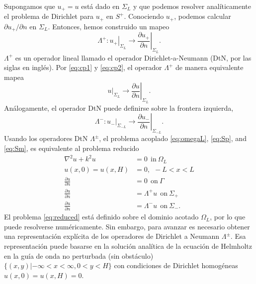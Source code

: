 \documentclass[11pt]{article}
\begin{document}
Supongamos que $u_+ = u$ está dado en $\Sigma_L$ y que podemos resolver analíticamente el problema de Dirichlet para $u_+$ en $S^+$. Conociendo $u_+$, podemos calcular $\partial u_+/\partial n$ en $\Sigma_L$. Entonces, hemos construido un mapeo
\begin{equation}
  \label{eq:12}
  \Lambda^+: \left.u_+\right|_{\Sigma_L} \rightarrow \left.\frac{\partial u_+}{\partial n}\right|_{\Sigma_L}.
\end{equation}
$\Lambda^+$ es un operador lineal llamado el operador Dirichlet-a-Neumann (DtN, por las siglas en inglés). Por \eqref{eq:cp1} y \eqref{eq:cp2}, el operador $\Lambda^+$ de manera equivalente mapea
\begin{equation}
  \label{eq:13}
  \left.u\right|_{\Sigma_L} \rightarrow \left.\frac{\partial u}{\partial n}\right|_{\Sigma_L}.
\end{equation}
Análogamente, el operador DtN puede definirse sobre la frontera izquierda,
\begin{equation}
  \label{eq:14}
  \Lambda^-: \left.u_-\right|_{\Sigma_{-L}} \rightarrow \left.\frac{\partial u_-}{\partial n}\right|_{\Sigma_{-L}}.  
\end{equation}
Usando los operadores DtN $\Lambda^{\pm}$, el problema acoplado \eqref{eq:omegaL}, \eqref{eq:Sp}, and \eqref{eq:Sm}, es equivalente al problema reducido
\begin{subequations}
  \label{eq:reduced}
  \begin{align}
    \nabla^2 u + k^2u &= 0~~\mathrm{in}~\Omega_L \\
  u(x,0)=u(x,H)&=0,~~-L < x < L \\
  \frac{\partial u}{\partial n} &= 0~~\mathrm{on}~ \Gamma \\
  \frac{\partial u}{\partial n} &= \Lambda^+ u~~\mathrm{on}~\Sigma_{+} \\
  \frac{\partial u}{\partial n} &= \Lambda^- u~~\mathrm{on}~\Sigma_{-}. 
  \end{align}
\end{subequations}
El problema \eqref{eq:reduced} está definido sobre el dominio acotado $\Omega_L$, por lo que puede resolverse numéricamente. Sin embargo, para avanzar es necesario obtener una representación explícita de los operadores de Dirichlet a Neumann $\Lambda^{\pm}$. Esa representación puede basarse en la solución analítica de la ecuación de Helmholtz en la guía de onda no perturbada (sin obstáculo) $\{(x,y)| -\infty < x < \infty, 0 < y < H\}$ con condiciones de Dirichlet homogéneas $u(x,0)=u(x,H) = 0$.
\end{document}

